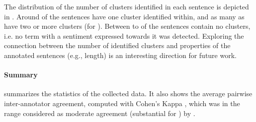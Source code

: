 The distribution of the number of clusters identified in each sentence is depicted in . Around  of the sentences have one cluster identified within, and as many as  have two or more clusters (for \OpinosisName).
Between  to  of the sentences contain no clusters, i.e. no term with a sentiment expressed towards it was detected. 
Exploring the connection between the number of identified clusters and properties of the annotated sentences (e.g.,  length) is an interesting direction for future work.

\paragraph{Summary}  summarizes the statistics of the collected data.
It also shows the average pairwise inter-annotator agreement, computed with Cohen's Kappa \citep{cohenKappa}, which was in the range considered as moderate agreement (substantial for \SeResName) by \citet{landis1977measurement}.
\newcommand{\kappaColumnTitle}[0]{\columnTitle{K}}
\newcommand{\numSentencesColumnTitle}[0]{\columnTitle{\#S}}
\newcommand{\numTargetsColumnTitle}[0]{\columnTitle{\#TC}}
\newcommand{\numHighConfidenceColumnTitle}[0]{\columnTitle{\#HC}}
\newcommand{\numValidTargetsColumnTitle}[0]{\columnTitle{\#VT}}
\newcommand{\numValidTargetGroupsColumnTitle}[0]{\columnTitle{\#TC}}

